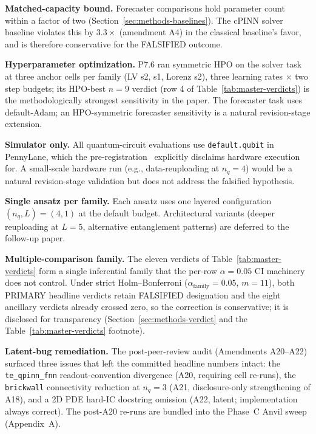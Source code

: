 \textbf{Matched-capacity bound.} Forecaster comparisons hold
parameter count within a factor of two
(Section~\ref{sec:methods-baselines}). The cPINN solver baseline
violates this by $3.3\times$ (amendment A4) in the classical
baseline's favor, and is therefore conservative for the
FALSIFIED outcome.

\textbf{Hyperparameter optimization.} P7.6 ran symmetric HPO on
the solver task at three anchor cells per family (LV s2,
\vdp{} s1, Lorenz s2), three learning rates $\times$ two
step budgets; its HPO-best $n=9$ verdict (row 4 of
Table~\ref{tab:master-verdicts}) is the methodologically
strongest sensitivity in the paper. The forecaster task uses
default-Adam; an HPO-symmetric forecaster sensitivity is a
natural revision-stage extension.

\textbf{Simulator only.} All quantum-circuit evaluations use
\texttt{default.qubit} in PennyLane, which the
pre-registration~\cite{schuld2022right} explicitly disclaims
hardware execution for. A small-scale hardware run (e.g.,
data-reuploading at $n_q = 4$) would be a natural revision-stage
validation but does not address the falsified hypothesis.

\textbf{Single ansatz per family.} Each ansatz uses one layered
configuration $(n_q, L) = (4, 1)$ at the default budget.
Architectural variants (deeper reuploading at $L = 5$,
alternative entanglement patterns) are deferred to the follow-up
paper.

\textbf{Multiple-comparison family.} The eleven verdicts of
Table~\ref{tab:master-verdicts} form a single inferential family
that the per-row $\alpha = 0.05$ CI machinery does not control.
Under strict Holm--Bonferroni ($\alpha_{\text{family}} = 0.05$,
$m = 11$), both PRIMARY headline verdicts retain FALSIFIED
designation and the eight ancillary verdicts already crossed
zero, so the correction is conservative; it is disclosed for
transparency (Section~\ref{sec:methods-verdict} and the
Table~\ref{tab:master-verdicts} footnote).

\textbf{Latent-bug remediation.} The post-peer-review audit
(Amendments A20--A22) surfaced three issues that left the
committed headline numbers intact: the \texttt{te\_qpinn\_fnn}
readout-convention divergence (A20, requiring cell re-runs), the
\texttt{brickwall} connectivity reduction at $n_q = 3$ (A21,
disclosure-only strengthening of A18), and a 2D PDE hard-IC
docstring omission (A22, latent; implementation always correct).
The post-A20 re-runs are bundled into the Phase~C Anvil sweep
(Appendix~A).

